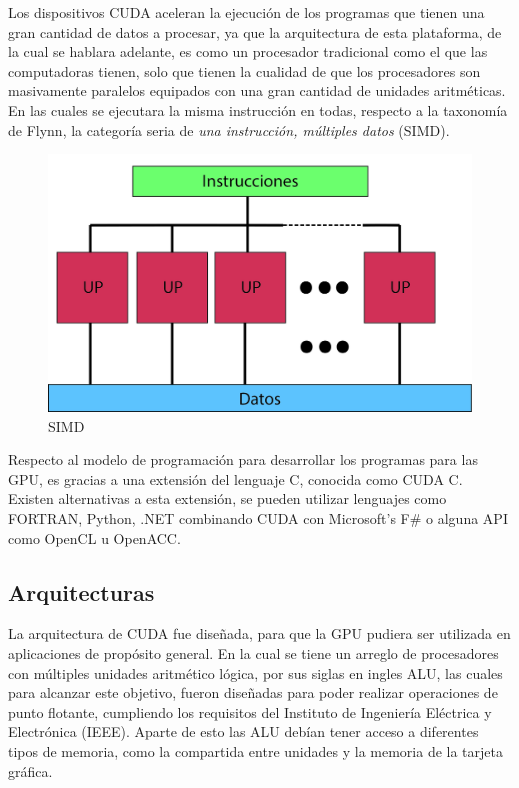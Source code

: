 Los dispositivos CUDA aceleran la ejecución de los programas que tienen una gran cantidad de datos a procesar, ya que la arquitectura de esta plataforma, de la cual se hablara adelante, es como un procesador tradicional como el que las computadoras tienen, solo que tienen la cualidad de que los procesadores son masivamente paralelos equipados con una gran cantidad de unidades aritméticas. En las cuales se ejecutara la misma instrucción en todas, respecto a la taxonomía de Flynn, la categoría seria de \textit{una instrucción, múltiples datos} (SIMD). 

\begin{figure}[h]
			\centering
				\includegraphics[scale=0.1]{img/SIMD.jpg}
			\caption{SIMD}
\end{figure}


Respecto al modelo de programación para desarrollar los programas para las GPU, es gracias a una extensión del lenguaje C, conocida como CUDA C. Existen alternativas a esta extensión, se pueden utilizar lenguajes como FORTRAN, Python, .NET combinando CUDA con Microsoft's F\# o alguna API como OpenCL u OpenACC\cite{lenguajes}. 
 

\subsection{Arquitecturas}
La arquitectura de CUDA fue diseñada, para que la GPU pudiera ser utilizada en aplicaciones de propósito general. En la cual se tiene un arreglo de procesadores con múltiples unidades aritmético lógica, por sus siglas en ingles ALU, las cuales para alcanzar este objetivo, fueron diseñadas para poder realizar operaciones de punto flotante, cumpliendo los requisitos del Instituto de Ingeniería Eléctrica y Electrónica (IEEE). Aparte de esto las ALU debían tener acceso a diferentes tipos de memoria, como la compartida entre unidades y la memoria de la tarjeta gráfica. 

